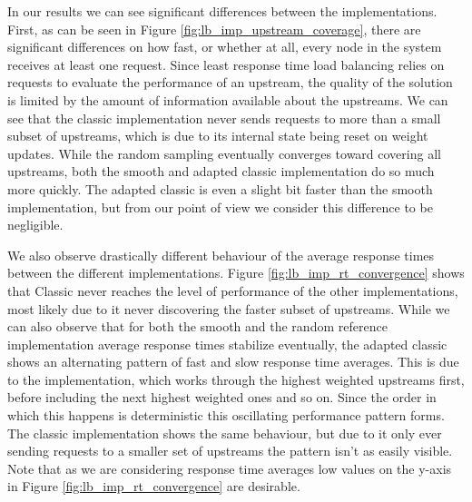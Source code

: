 \documentclass[draft,final]{vutinfth} %
\begin{document}
In our results we can see significant differences between the implementations.
First, as can be seen in Figure \ref{fig:lb_imp_upstream_coverage}, there are significant differences on how fast, or whether at all, every node in the system receives at least one request.
Since least response time load balancing relies on requests to evaluate the performance of an upstream, the quality of the solution is limited by the amount of information available about the upstreams.
We can see that the classic implementation never sends requests to more than a small subset of upstreams, which is due to its internal state being reset on weight updates.
While the random sampling eventually converges toward covering all upstreams, both the smooth and adapted classic implementation do so much more quickly.
The adapted classic is even a slight bit faster than the smooth implementation, but from our point of view we consider this difference to be negligible.

We also observe drastically different behaviour of the average response times between the different implementations.
Figure \ref{fig:lb_imp_rt_convergence} shows that Classic never reaches the level of performance of the other implementations, most likely due to it never discovering the faster subset of upstreams.
While we can also observe that for both the smooth and the random reference implementation average response times stabilize eventually, the adapted classic shows an alternating pattern of fast and slow response time averages.
This is due to the implementation, which works through the highest weighted upstreams first, before including the next highest weighted ones and so on.
Since the order in which this happens is deterministic this oscillating performance pattern forms.
The classic implementation shows the same behaviour, but due to it only ever sending requests to a smaller set of upstreams the pattern isn't as easily visible.
Note that as we are considering response time averages low values on the y-axis in Figure \ref{fig:lb_imp_rt_convergence} are desirable.












\end{document}
